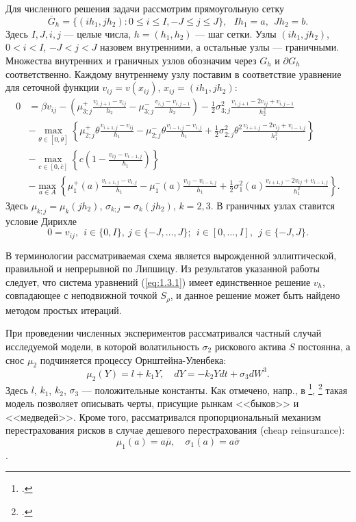 \documentclass[twoside,12pt]{article}
\begin{document}
Для численного решения задачи рассмотрим прямоугольную сетку
$$\overline G_h=\{(ih_1,jh_2):0\le i\le I,-J\le j\le J\},\ \ \  Ih_1=a,\ \ Jh_2=b.$$
Здесь $I,J,i,j$ --- целые числа, $h=(h_1,h_2)$ --- шаг сетки. Узлы $(ih_1,jh_2)$, $0<i<I$, $-J<j<J $ назовем внутренними, а остальные узлы --- граничными. Множества внутренних и граничных узлов обозначим через $G_h$ и $\partial G_h$ соответственно. Каждому внутреннему узлу поставим в соответствие уравнение для сеточной функции $v_{ij}=v(x_{ij})$, $x_{ij}=(ih_1,jh_2)$:
\begin{align}
0 &=\beta v_{ij} -\left(\mu_{3;j}^+ \frac{v_{i,j+1}-v_{ij}}{h_2}-\mu_{3;j}^-\frac{v_{i,j}-v_{i,j-1}}{h_2}\right)-\frac{1}{2}\sigma_{3;j}^2 \frac{v_{i,j+1}-2 v_{ij}+v_{i,j-1}}{h_2^2}  \nonumber \\
&-\max_{\theta\in [0,\overline\theta]}\left\{\mu_{2;j}^+\theta \frac{v_{i+1,j}-v_{ij}}{h_1} -\mu_{2;j}^- \theta \frac{v_{i-1,j}-v_{i,j}}{h_1} +\frac{1}{2}\sigma_{2;j}^2\theta^2 \frac{v_{i+1,j}-2 v_{ij}+v_{i-1,j}}{h_1^2}\right\} \label{eq:1.3.1} \\
&-\max_{c\in [0,\overline c]} \left\{c\left(1-\frac{v_{ij}-v_{i-1,j}}{h_1}\right)\right\} \nonumber \\
& -\max_{a\in A}\left\{\mu_1^+(a) \frac{v_{i+1,j}-v_{i,j}}{h_1}-\mu_1^-(a) \frac{v_{ij}-v_{i-1,j}}{h_1}+\frac{1}{2}\sigma_1^2(a)\frac{v_{i+1,j}-2 v_{ij}+v_{i-1,j}}{h_1^2}\right\}. \nonumber
\end{align}
Здесь $\mu_{k;j}=\mu_k(jh_2)$, $\sigma_{k;j}=\sigma_k(jh_2)$, $k=2,3$. В граничных узлах  ставится условие Дирихле
$$ 0=v_{ij},\ \ i\in\{0,I\},\ j\in \{-J,\dots,J\};\ \ i\in [0,\dots,I],\ \ j\in\{-J,J\}.$$

В терминологии  рассматриваемая схема является вырожденной эллиптической, правильной и непрерывной по Липшицу.
Из результатов указанной работы следует, что система уравнений (\ref{eq:1.3.1}) имеет единственное решение $v_h$, совпадающее с неподвижной точкой $S_\rho$, и данное решение может быть найдено  методом простых итераций.

При проведении численных экспериментов рассматривался частный случай исследуемой модели, в которой волатильность $\sigma_2$ рискового актива $S$ постоянна, а снос $\mu_2$ подчиняется процессу Орнштейна-Уленбека:
$$\mu_2(Y)  =l+ k_1 Y,\quad  dY=-k_2 Y dt + \sigma_3 dW^3. $$
Здесь $l$, $k_1$, $k_2$, $\sigma_3$ --- положительные константы. Как отмечено, напр.,  в \footcite{Ris99}, \footcite{LiaYueGuo11} такая модель позволяет описывать черты, присущие рынкам <<быков>> и <<медведей>>. Кроме того, рассматривался пропорциональный механизм перестрахования рисков в случае дешевого перестрахования (cheap reinsurance):
\begin{equation}
\mu_1(a)=a \overline\mu,\quad \sigma_1 (a)=a\overline\sigma
\end{equation}.
\end{document}
